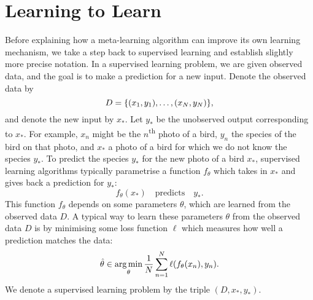 \documentclass[12pt, twoside]{report}
\begin{document}
\section{Learning to Learn}
\label{sec:introducion:learning_to_learn}
Before explaining how a meta-learning algorithm can improve its own learning mechanism,
we take a step back to supervised learning and establish slightly more precise notation.
In a supervised learning problem, we are given observed data, and the goal is to make a prediction for a new input.
Denote the observed data by
\begin{equation} \label{eq:introduction:supervised_observed_data}
    D = \set{(x_1, y_1), \ldots, (x_N, y_N)},
\end{equation}
and denote the new input by $x_*$.
Let $y_*$ be the unobserved output corresponding to $x_*$.
For example, $x_n$ might be the $n$\textsuperscript{th} photo of a bird, $y_n$ the species of the bird on that photo, and $x_*$ a photo of a bird for which we do not know the species $y_*$.
To predict the species $y_*$ for the new photo of a bird $x_*$, supervised learning algorithms typically parametrise a function $f_\theta$ which takes in $x_*$ and gives back a prediction for $y_*$: 
\begin{equation}
    f_\theta(x_*)
    \quad\text{predicts}\quad
    y_*
    .
\end{equation}
This function $f_\theta$ depends on some parameters $\theta$, which are learned from the observed data $D$.
A typical way to learn these parameters $\theta$ from the observed data $D$ is by minimising some loss function $\ell$ which measures how well a prediction matches the data:
\begin{equation} \label{eq:supervised_learning_minimisation}
    \hat\theta \in \argmin_{\theta} \frac1N \sum_{n=1}^N \ell(f_\theta(x_n), y_n).
\end{equation}
We denote a supervised learning problem by the triple $(D, x_*, y_*)$.
\end{document}
